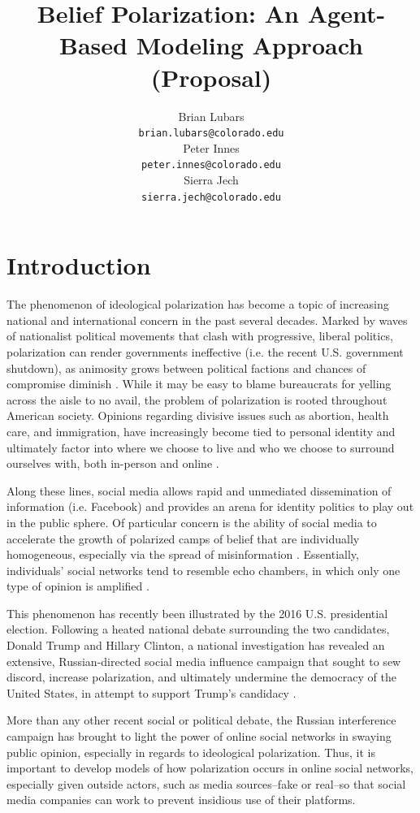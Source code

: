\documentclass{article}
\title{Belief Polarization: An Agent-Based Modeling Approach (Proposal)}
\author{
  Brian Lubars \\
  \texttt{brian.lubars@colorado.edu} \\
   \And
  Peter Innes \\
  \texttt{peter.innes@colorado.edu} \\
  \And
  Sierra Jech \\
  \texttt{sierra.jech@colorado.edu}
}
\begin{document}
\maketitle


\section{Introduction}
The phenomenon of ideological polarization has become a topic of increasing national and international concern in the past several decades. Marked by waves of nationalist political movements that clash with progressive, liberal politics, polarization can render governments ineffective (i.e. the recent U.S. government shutdown), as animosity grows between political factions and chances of compromise diminish \citep{party_loathing}. While it may be easy to blame bureaucrats for yelling across the aisle to no avail, the problem of polarization is rooted throughout American society. Opinions regarding divisive issues such as abortion, health care, and immigration, have increasingly become tied to personal identity and ultimately factor into where we choose to live and who we choose to surround ourselves with, both in-person and online \citep{polarized_society}.

Along these lines, social media allows rapid and unmediated dissemination of information (i.e. Facebook) and provides an arena for identity politics to play out in the public sphere. Of particular concern is the ability of social media to accelerate the growth of polarized camps of belief that are individually homogeneous, especially via the spread of misinformation \citep{PNASmisinfo}. Essentially, individuals' social networks tend to resemble echo chambers, in which only one type of opinion is amplified \citep{facebook_echo}.

This phenomenon has recently been illustrated by the 2016 U.S. presidential election. Following a heated national debate surrounding the two candidates, Donald Trump and Hillary Clinton, a national investigation has revealed an extensive, Russian-directed social media influence campaign that sought to sew discord, increase polarization, and ultimately undermine the democracy of the United States, in attempt to support Trump's candidacy \citep{russian}.

More than any other recent social or political debate, the Russian interference campaign has  brought to light the power of online social networks in swaying public opinion, especially in regards to ideological polarization. Thus, it is important to develop models of how polarization occurs in online social networks, especially given outside actors, such as media sources--fake or real--so that social media companies can work to prevent insidious use of their platforms.
\end{document}
